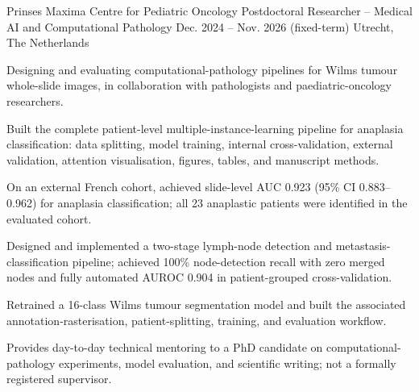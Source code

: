 
\begin{cventries}
\cventry
  {Prinses Maxima Centre for Pediatric Oncology}
  {Postdoctoral Researcher -- Medical AI and Computational Pathology}
  {Dec. 2024 -- Nov. 2026 (fixed-term)}
  {Utrecht, The Netherlands}
  {
    \begin{cvitems}
      \item {Designing and evaluating computational-pathology pipelines for Wilms tumour whole-slide images, in collaboration with pathologists and paediatric-oncology researchers.}
      \item {Built the complete patient-level multiple-instance-learning pipeline for anaplasia classification: data splitting, model training, internal cross-validation, external validation, attention visualisation, figures, tables, and manuscript methods.}
      \item {On an external French cohort, achieved slide-level AUC 0.923 (95\% CI 0.883--0.962) for anaplasia classification; all 23 anaplastic patients were identified in the evaluated cohort.}
      \item {Designed and implemented a two-stage lymph-node detection and metastasis-classification pipeline; achieved 100\% node-detection recall with zero merged nodes and fully automated AUROC 0.904 in patient-grouped cross-validation.}
      \item {Retrained a 16-class Wilms tumour segmentation model and built the associated annotation-rasterisation, patient-splitting, training, and evaluation workflow.}
      \item {Provides day-to-day technical mentoring to a PhD candidate on computational-pathology experiments, model evaluation, and scientific writing; not a formally registered supervisor.}
    \end{cvitems}
  }


\end{cventries}
